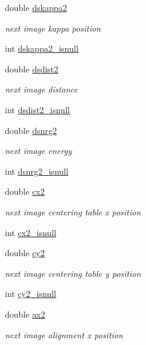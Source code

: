 \begin{DoxyCompactItemize}
double \hyperlink{structlspg__nextshot__struct_a8571a0b95fb6ea6356fd7204b9c9e371}{dskappa2}
\begin{DoxyCompactList}\small\item\em next image kappa position \end{DoxyCompactList}\item 
int \hyperlink{structlspg__nextshot__struct_a9a7e47372f4f6e0e48a0cb3c78fa8437}{dskappa2\-\_\-isnull}
\item 
double \hyperlink{structlspg__nextshot__struct_a516827749068577217b27860a01e6041}{dsdist2}
\begin{DoxyCompactList}\small\item\em next image distance \end{DoxyCompactList}\item 
int \hyperlink{structlspg__nextshot__struct_a7fce65f4719a4a8110006f8b72eec3f7}{dsdist2\-\_\-isnull}
\item 
double \hyperlink{structlspg__nextshot__struct_ae461439c2af31255227765c0fb61850f}{dsnrg2}
\begin{DoxyCompactList}\small\item\em next image energy \end{DoxyCompactList}\item 
int \hyperlink{structlspg__nextshot__struct_aee9f8196dd9bcea832a60f2f0ea3a999}{dsnrg2\-\_\-isnull}
\item 
double \hyperlink{structlspg__nextshot__struct_a10d45763100bc59f9a5f68f1b48db6d3}{cx2}
\begin{DoxyCompactList}\small\item\em next image centering table x position \end{DoxyCompactList}\item 
int \hyperlink{structlspg__nextshot__struct_a3ad947f4efe2cb5c338244b019334749}{cx2\-\_\-isnull}
\item 
double \hyperlink{structlspg__nextshot__struct_a3644e5c3f12af18a3b426d4d4d7e16a5}{cy2}
\begin{DoxyCompactList}\small\item\em next image centering table y position \end{DoxyCompactList}\item 
int \hyperlink{structlspg__nextshot__struct_a57d78a389413827302df6ebe3dcb3c89}{cy2\-\_\-isnull}
\item 
double \hyperlink{structlspg__nextshot__struct_ab76bd38d2a098bc7eda82aff5dcb9c66}{ax2}
\begin{DoxyCompactList}\small\item\em next image alignment x position \end{DoxyCompactList}\item 

\end{DoxyCompactItemize}
